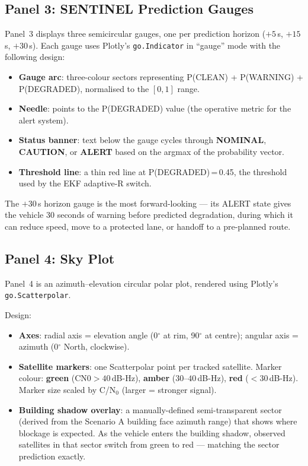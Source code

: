 \documentclass[12pt,a4paper]{article}
\newcommand{\code}[1]{\texttt{#1}}
\newcommand{\clean}[1]{\textcolor{cleanGreen}{\textbf{#1}}}
\newcommand{\warn}[1]{\textcolor{warnOrange}{\textbf{#1}}}
\newcommand{\degrad}[1]{\textcolor{degradRed}{\textbf{#1}}}
\begin{document}
\subsection{Panel 3: SENTINEL Prediction Gauges}

Panel~3 displays three semicircular gauges, one per prediction horizon ($+5$\,s, $+15$\,s,
$+30$\,s).
Each gauge uses Plotly's \code{go.Indicator} in ``gauge'' mode with the following design:

\begin{itemize}
  \item \textbf{Gauge arc}: three-colour sectors representing P(CLEAN) + P(WARNING)
    + P(DEGRADED), normalised to the $[0, 1]$ range.
  \item \textbf{Needle}: points to the P(DEGRADED) value (the operative metric for the
    alert system).
  \item \textbf{Status banner}: text below the gauge cycles through
    \clean{\textbf{NOMINAL}}, \warn{\textbf{CAUTION}}, or \degrad{\textbf{ALERT}}
    based on the argmax of the probability vector.
  \item \textbf{Threshold line}: a thin red line at P(DEGRADED)\,=\,0.45, the threshold
    used by the EKF adaptive-R switch.
\end{itemize}

The $+30$\,s horizon gauge is the most forward-looking --- its ALERT state gives the
vehicle 30 seconds of warning before predicted degradation, during which it can reduce
speed, move to a protected lane, or handoff to a pre-planned route.

\subsection{Panel 4: Sky Plot}

Panel~4 is an azimuth--elevation circular polar plot, rendered using Plotly's
\code{go.Scatterpolar}.

Design:
\begin{itemize}
  \item \textbf{Axes}: radial axis = elevation angle (0$^\circ$ at rim, 90$^\circ$ at
    centre); angular axis = azimuth (0$^\circ$ North, clockwise).
  \item \textbf{Satellite markers}: one Scatterpolar point per tracked satellite.
    Marker colour: \clean{green} ($\text{CN0} > 40$\,dB-Hz),
    \warn{amber} ($30$--$40$\,dB-Hz), \degrad{red} ($< 30$\,dB-Hz).
    Marker size scaled by C/N$_0$ (larger = stronger signal).
  \item \textbf{Building shadow overlay}: a manually-defined semi-transparent sector
    (derived from the Scenario A building face azimuth range) that shows where blockage
    is expected.
    As the vehicle enters the building shadow, observed satellites in that sector switch
    from green to red --- matching the sector prediction exactly.
\end{itemize}
\end{document}
